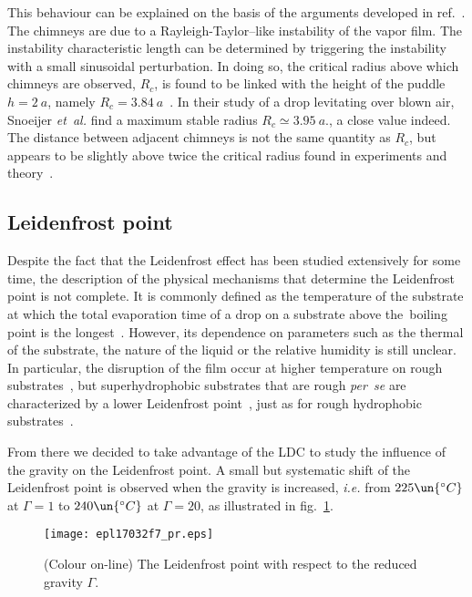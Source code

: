 \documentclass[doublecol,final]{epl2}
\begin{document}
This behaviour can be explained on the basis of the arguments developed in ref.~\cite{epl17032bib3}. The chimneys are due to a Rayleigh-Taylor--like instability of the vapor film. The instability characteristic length can be determined by triggering the instability with a small sinusoidal perturbation. In doing so, the critical radius above which chimneys are observed, $R_{c}$, is found to be linked with the height of the puddle $h=2\ a$, namely $R_c=3.84\ a$~\cite{epl17032bib3}. In their study of a drop levitating over blown air, Snoeijer \textit{et~al.} find a maximum stable radius $R_c \simeq 3.95\ a$.\cite{epl17032bib4}, a close value indeed. The distance between adjacent chimneys is not the same quantity as $R_c$, but appears to be slightly above twice the critical radius found in experiments and theory~\cite{epl17032bib3,epl17032bib4,epl17032bib8}.

\subsection{Leidenfrost point}

Despite the fact that the Leidenfrost effect has been studied extensively for some time, the description of the physical mechanisms that determine the Leidenfrost point is not complete. It is commonly defined as the temperature of the substrate at which the total evaporation time of a drop on a substrate above the~boiling point is the longest~\cite{epl17032bib3,epl17032bib19,epl17032bib20,epl17032bib23,epl17032bib27}. However, its dependence on parameters such as the thermal  of the substrate, the nature of the liquid or the relative humidity is still unclear. In particular, the disruption of the film occur at higher temperature on rough substrates~\cite{epl17032bib20,epl17032bib21,epl17032bib22,epl17032bib23}, but superhydrophobic substrates that are rough \textit{per~se} are characterized by a lower Leidenfrost point~\cite{epl17032bib24}, just as for rough hydrophobic substrates~\cite{epl17032bib25}.

From there we decided to take advantage of the LDC to study the influence of the gravity on the Leidenfrost point. A small but systematic shift of the Leidenfrost point is observed when the gravity is increased, \textit{i.e.} from $225\un{^\circ C}$ at $\Gamma=1$ to $240\un{^\circ C}$ at $\Gamma=20$, as illustrated in fig.~\ref{epl17032fig7}.

\begin{figure}%
\centering
\texttt{[image: epl17032f7\_pr.eps]}
\caption{(Colour on-line) The Leidenfrost point with respect to the reduced gravity $\Gamma$.} \label{epl17032fig7}
\end{figure}
\end{document}

